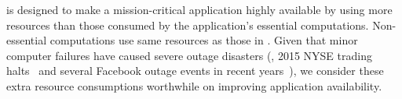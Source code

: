 

\tripod is designed to make a mission-critical application highly available by 
using  more resources than those consumed by the application's 
essential computations. Non-essential computations use same resources as those 
in \mesos. Given that minor computer failures have caused severe outage 
disasters  (\eg, 2015 NYSE trading halts~\cite{nyse:halt} and several Facebook 
outage events in recent 
years~\cite{facebook:outage}), we consider these extra resource consumptions 
worthwhile on improving application availability.







